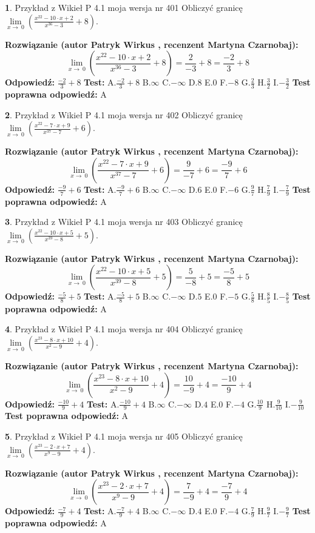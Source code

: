 \documentclass[12pt, a4paper]{article}
\theoremstyle{definition} %
\newtheorem{zad}{}
\newcommand{\zadStart}[1]{\begin{zad}#1\newline}
\newcommand{\zadStop}{\end{zad}}
\newcommand{\rozwStart}[2]{\noindent \textbf{Rozwiązanie (autor #1 , recenzent #2): }\newline}
\newcommand{\rozwStop}{\newline}
\newcommand{\odpStart}{\noindent \textbf{Odpowiedź:}\newline}
\newcommand{\odpStop}{\newline}
\newcommand{\testStart}{\noindent \textbf{Test:}\newline}
\newcommand{\testStop}{\newline}
\newcommand{\kluczStart}{\noindent \textbf{Test poprawna odpowiedź:}\newline}
\newcommand{\kluczStop}{\newline}
\begin{document}
\zadStart{Przykład z Wikieł P 4.1 moja wersja nr 401}
Obliczyć granicę $\lim\limits_{x\to\ 0}(\frac{x^{22}-10 \cdot x +2}{x^{36}-3}+8)$.
\zadStop
\rozwStart{Patryk Wirkus}{Martyna Czarnobaj}
$$\lim\limits_{x\to\ 0}(\frac{x^{22}-10 \cdot x +2}{x^{36}-3}+8)=\frac{2}{-3}+8=\frac{-2}{3}+8$$
\rozwStop
\odpStart
$\frac{-2}{3}+8$
\odpStop
\testStart
A.$\frac{-2}{3}+8$
B.$\infty$
C.$-\infty$
D.$8$
E.$0$
F.$-8$
G.$\frac{2}{3}$
H.$\frac{3}{2}$
I.$-\frac{3}{2}$
\testStop
\kluczStart
A
\kluczStop



\zadStart{Przykład z Wikieł P 4.1 moja wersja nr 402}
Obliczyć granicę $\lim\limits_{x\to\ 0}(\frac{x^{22}-7 \cdot x +9}{x^{37}-7}+6)$.
\zadStop
\rozwStart{Patryk Wirkus}{Martyna Czarnobaj}
$$\lim\limits_{x\to\ 0}(\frac{x^{22}-7 \cdot x +9}{x^{37}-7}+6)=\frac{9}{-7}+6=\frac{-9}{7}+6$$
\rozwStop
\odpStart
$\frac{-9}{7}+6$
\odpStop
\testStart
A.$\frac{-9}{7}+6$
B.$\infty$
C.$-\infty$
D.$6$
E.$0$
F.$-6$
G.$\frac{9}{7}$
H.$\frac{7}{9}$
I.$-\frac{7}{9}$
\testStop
\kluczStart
A
\kluczStop



\zadStart{Przykład z Wikieł P 4.1 moja wersja nr 403}
Obliczyć granicę $\lim\limits_{x\to\ 0}(\frac{x^{22}-10 \cdot x +5}{x^{39}-8}+5)$.
\zadStop
\rozwStart{Patryk Wirkus}{Martyna Czarnobaj}
$$\lim\limits_{x\to\ 0}(\frac{x^{22}-10 \cdot x +5}{x^{39}-8}+5)=\frac{5}{-8}+5=\frac{-5}{8}+5$$
\rozwStop
\odpStart
$\frac{-5}{8}+5$
\odpStop
\testStart
A.$\frac{-5}{8}+5$
B.$\infty$
C.$-\infty$
D.$5$
E.$0$
F.$-5$
G.$\frac{5}{8}$
H.$\frac{8}{5}$
I.$-\frac{8}{5}$
\testStop
\kluczStart
A
\kluczStop



\zadStart{Przykład z Wikieł P 4.1 moja wersja nr 404}
Obliczyć granicę $\lim\limits_{x\to\ 0}(\frac{x^{23}-8 \cdot x +10}{x^{2}-9}+4)$.
\zadStop
\rozwStart{Patryk Wirkus}{Martyna Czarnobaj}
$$\lim\limits_{x\to\ 0}(\frac{x^{23}-8 \cdot x +10}{x^{2}-9}+4)=\frac{10}{-9}+4=\frac{-10}{9}+4$$
\rozwStop
\odpStart
$\frac{-10}{9}+4$
\odpStop
\testStart
A.$\frac{-10}{9}+4$
B.$\infty$
C.$-\infty$
D.$4$
E.$0$
F.$-4$
G.$\frac{10}{9}$
H.$\frac{9}{10}$
I.$-\frac{9}{10}$
\testStop
\kluczStart
A
\kluczStop



\zadStart{Przykład z Wikieł P 4.1 moja wersja nr 405}
Obliczyć granicę $\lim\limits_{x\to\ 0}(\frac{x^{23}-2 \cdot x +7}{x^{9}-9}+4)$.
\zadStop
\rozwStart{Patryk Wirkus}{Martyna Czarnobaj}
$$\lim\limits_{x\to\ 0}(\frac{x^{23}-2 \cdot x +7}{x^{9}-9}+4)=\frac{7}{-9}+4=\frac{-7}{9}+4$$
\rozwStop
\odpStart
$\frac{-7}{9}+4$
\odpStop
\testStart
A.$\frac{-7}{9}+4$
B.$\infty$
C.$-\infty$
D.$4$
E.$0$
F.$-4$
G.$\frac{7}{9}$
H.$\frac{9}{7}$
I.$-\frac{9}{7}$
\testStop
\kluczStart
A
\kluczStop
\end{document}
